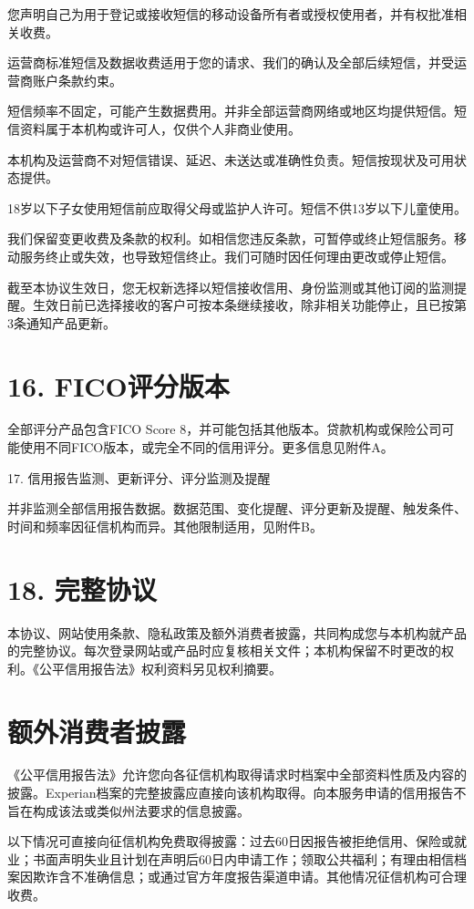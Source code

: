 \documentclass[UTF8,fontset=none,11pt,a4paper]{ctexart}
\begin{document}
您声明自己为用于登记或接收短信的移动设备所有者或授权使用者，并有权批准相关收费。


运营商标准短信及数据收费适用于您的请求、我们的确认及全部后续短信，并受运营商账户条款约束。


短信频率不固定，可能产生数据费用。并非全部运营商网络或地区均提供短信。短信资料属于本机构或许可人，仅供个人非商业使用。


本机构及运营商不对短信错误、延迟、未送达或准确性负责。短信按现状及可用状态提供。


18岁以下子女使用短信前应取得父母或监护人许可。短信不供13岁以下儿童使用。


我们保留变更收费及条款的权利。如相信您违反条款，可暂停或终止短信服务。移动服务终止或失效，也导致短信终止。我们可随时因任何理由更改或停止短信。


截至本协议生效日，您无权新选择以短信接收信用、身份监测或其他订阅的监测提醒。生效日前已选择接收的客户可按本条继续接收，除非相关功能停止，且已按第3条通知产品更新。


\section*{16. FICO评分版本}
全部评分产品包含FICO Score 8，并可能包括其他版本。贷款机构或保险公司可能使用不同FICO版本，或完全不同的信用评分。更多信息见附件A。


17. 信用报告监测、更新评分、评分监测及提醒


并非监测全部信用报告数据。数据范围、变化提醒、评分更新及提醒、触发条件、时间和频率因征信机构而异。其他限制适用，见附件B。


\section*{18. 完整协议}
本协议、网站使用条款、隐私政策及额外消费者披露，共同构成您与本机构就产品的完整协议。每次登录网站或产品时应复核相关文件；本机构保留不时更改的权利。《公平信用报告法》权利资料另见权利摘要。


\section*{额外消费者披露}
《公平信用报告法》允许您向各征信机构取得请求时档案中全部资料性质及内容的披露。Experian档案的完整披露应直接向该机构取得。向本服务申请的信用报告不旨在构成该法或类似州法要求的信息披露。


以下情况可直接向征信机构免费取得披露：过去60日因报告被拒绝信用、保险或就业；书面声明失业且计划在声明后60日内申请工作；领取公共福利；有理由相信档案因欺诈含不准确信息；或通过官方年度报告渠道申请。其他情况征信机构可合理收费。
\end{document}
